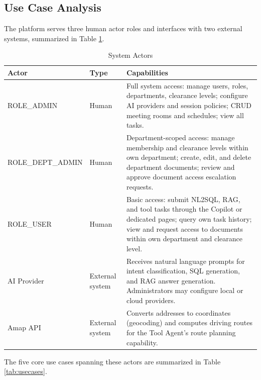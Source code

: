 \subsection{Use Case Analysis}

The platform serves three human actor roles and interfaces with two external systems, summarized in Table \ref{tab:actors}.

\begin{table}[H]
\centering
\small\singlespacing
\caption{System Actors}
\label{tab:actors}
\begin{tabularx}{\textwidth}{>{\RaggedRight\arraybackslash}p{}>{\RaggedRight\arraybackslash}p{}>{\RaggedRight\arraybackslash}X}
\toprule
\textbf{Actor} & \textbf{Type} & \textbf{Capabilities} \\
\midrule
ROLE\_ADMIN & Human & Full system access: manage users, roles, departments, clearance levels; configure AI providers and session policies; CRUD meeting rooms and schedules; view all tasks. \\
\addlinespace
ROLE\_DEPT\_ADMIN & Human & Department-scoped access: manage membership and clearance levels within own department; create, edit, and delete department documents; review and approve document access escalation requests. \\
\addlinespace
ROLE\_USER & Human & Basic access: submit NL2SQL, RAG, and tool tasks through the Copilot or dedicated pages; query own task history; view and request access to documents within own department and clearance level. \\
\addlinespace
AI Provider & External system & Receives natural language prompts for intent classification, SQL generation, and RAG answer generation. Administrators may configure local or cloud providers. \\
\addlinespace
Amap API & External system & Converts addresses to coordinates (geocoding) and computes driving routes for the Tool Agent's route planning capability. \\
\bottomrule
\end{tabularx}
\end{table}

The five core use cases spanning these actors are summarized in Table \ref{tab:usecases}.

